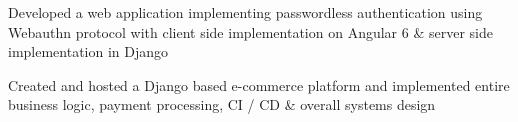 \documentclass[letterpaper]{deedy-resume} %
\begin{document}
\begin{minipage}[t]{0.66\textwidth}
\sectionspace %

Developed a web application implementing passwordless authentication using Webauthn protocol with client side implementation on Angular 6 \& server side implementation in Django

\sectionspace %

Created and hosted a Django based e-commerce platform and implemented entire business logic, payment processing, CI / CD \& overall systems design







\end{minipage}
\end{document}
